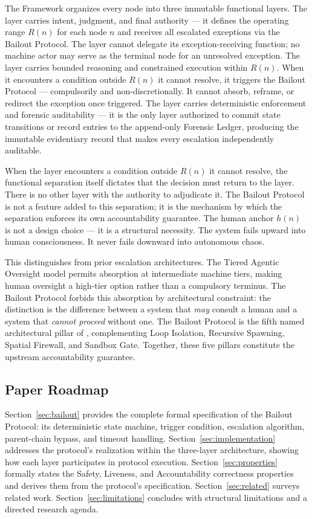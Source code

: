 The \bxthree Framework organizes every node into three immutable functional layers. The \textbf{\purpose} layer carries intent, judgment, and final authority — it defines the operating range $R(n)$ for each node $n$ and receives all escalated exceptions via the Bailout Protocol. The \purpose layer cannot delegate its exception-receiving function; no machine actor may serve as the terminal node for an unresolved exception. The \textbf{\bounds} layer carries bounded reasoning and constrained execution within $R(n)$. When it encounters a condition outside $R(n)$ it cannot resolve, it triggers the Bailout Protocol — compulsorily and non-discretionally. It cannot absorb, reframe, or redirect the exception once triggered. The \textbf{\fact} layer carries deterministic enforcement and forensic auditability — it is the only layer authorized to commit state transitions or record entries to the append-only Forensic Ledger, producing the immutable evidentiary record that makes every escalation independently auditable.

When the \bounds layer encounters a condition outside $R(n)$ it cannot resolve, the functional separation itself dictates that the decision must return to the \purpose layer. There is no other layer with the authority to adjudicate it. The Bailout Protocol is not a feature added to this separation; it is the mechanism by which the separation enforces its own accountability guarantee. The human anchor $h(n)$ is not a design choice — it is a structural necessity. The \bxthree system fails upward into human consciousness. It never fails downward into autonomous chaos.

This distinguishes \bxthree from prior escalation architectures. The Tiered Agentic Oversight model \cite{kim2025tao} permits absorption at intermediate machine tiers, making human oversight a high-tier option rather than a compulsory terminus. The Bailout Protocol forbids this absorption by architectural constraint: the distinction is the difference between a system that \emph{may} consult a human and a system that \emph{cannot proceed} without one. The Bailout Protocol is the fifth named architectural pillar of \bxthree, complementing Loop Isolation, Recursive Spawning, Spatial Firewall, and Sandbox Gate. Together, these five pillars constitute the upstream accountability guarantee.

\subsection{Paper Roadmap}

Section~\ref{sec:bailout} provides the complete formal specification of the Bailout Protocol: its deterministic state machine, trigger condition, escalation algorithm, parent-chain bypass, and timeout handling. Section~\ref{sec:implementation} addresses the protocol's realization within the \bxthree three-layer architecture, showing how each layer participates in protocol execution. Section~\ref{sec:properties} formally states the Safety, Liveness, and Accountability correctness properties and derives them from the protocol's specification. Section~\ref{sec:related} surveys related work. Section~\ref{sec:limitations} concludes with structural limitations and a directed research agenda.

